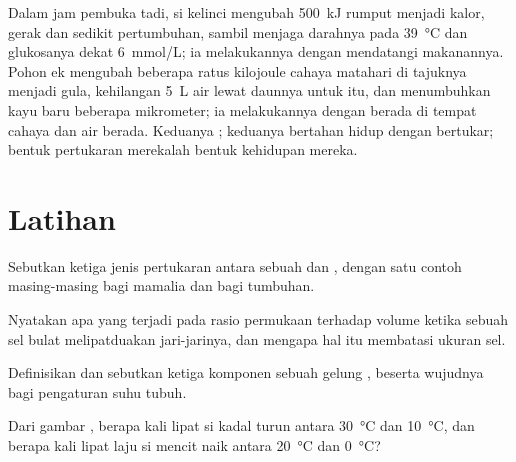 \begin{example}\label{ex:b1:organism-environment:budgets}
Dalam jam pembuka tadi, si kelinci mengubah \qty{500}{kJ} rumput menjadi
kalor, gerak dan sedikit pertumbuhan, sambil menjaga darahnya pada
\qty{39}{\celsius} dan glukosanya dekat \qty{6}{mmol/L}; ia melakukannya
dengan mendatangi makanannya. Pohon ek mengubah beberapa ratus kilojoule
cahaya matahari di tajuknya menjadi gula, kehilangan \qty{5}{L} air lewat
daunnya untuk itu, dan menumbuhkan kayu baru beberapa mikrometer; ia
melakukannya dengan berada di tempat cahaya dan air berada. Keduanya
; keduanya bertahan hidup dengan bertukar; bentuk
pertukaran merekalah bentuk kehidupan mereka.
\end{example}

\section{Latihan}

\begin{exercise}[$\star$]\label{exo:b1:organism-environment:1}
Sebutkan ketiga jenis pertukaran antara sebuah  dan
, dengan satu contoh masing-masing bagi mamalia dan bagi
tumbuhan.
\end{exercise}

\begin{exercise}[$\star$]\label{exo:b1:organism-environment:2}
Nyatakan apa yang terjadi pada rasio permukaan terhadap volume ketika
sebuah sel bulat melipatduakan jari-jarinya, dan mengapa hal itu
membatasi ukuran sel.
\end{exercise}

\begin{exercise}[$\star$]\label{exo:b1:organism-environment:3}
Definisikan  dan sebutkan ketiga komponen sebuah gelung , beserta wujudnya bagi pengaturan suhu tubuh.
\end{exercise}

\begin{exercise}[$\star$]\label{exo:b1:organism-environment:4}
Dari gambar , berapa kali lipat  si
kadal turun antara \qty{30}{\celsius} dan \qty{10}{\celsius}, dan
berapa kali lipat laju si mencit naik antara \qty{20}{\celsius} dan
\qty{0}{\celsius}?
\end{exercise}

